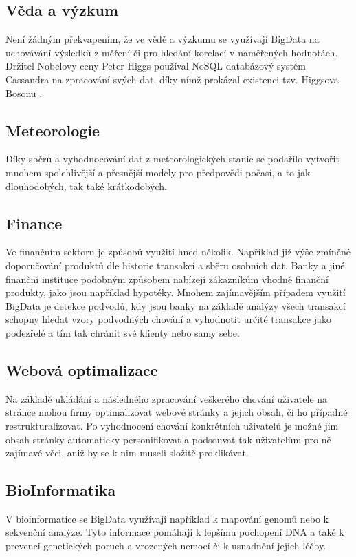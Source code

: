 \subsection{Věda a výzkum}

Není žádným překvapením, že ve vědě a výzkumu se využívají BigData na uchovávání výsledků z měření či pro hledání korelací v naměřených hodnotách. Držitel Nobelovy ceny Peter Higgs používal NoSQL databázový systém Cassandra na zpracování svých dat, díky nímž prokázal existenci tzv. Higgsova Bosonu \cite{higgs}.

\subsection{Meteorologie}
Díky sběru a vyhodnocování dat z meteorologických stanic se podařilo vytvořit mnohem spolehlivější a přesnější modely pro předpovědi počasí, a to jak dlouhodobých, tak také krátkodobých. 

\subsection{Finance}
Ve finančním sektoru je způsobů využití hned několik. Například již výše zmíněné doporučování produktů dle historie transakcí a sběru  osobních dat. Banky a jiné finanční instituce podobným způsobem nabízejí zákazníkům vhodné finanční produkty, jako jsou například hypotéky. Mnohem zajímavějším případem využití BigData je detekce podvodů, kdy jsou banky na základě analýzy všech transakcí schopny hledat vzory podvodných chování a vyhodnotit určité transakce jako podezřelé a tím tak chránit své klienty nebo samy sebe.

\subsection{Webová optimalizace}
Na základě ukládání a následného zpracování veškerého chování uživatele na stránce mohou firmy optimalizovat webové stránky a jejich obsah, či ho případně restrukturalizovat. Po vyhodnocení chování konkrétních uživatelů je možné jim obsah stránky automaticky personifikovat a podsouvat tak uživatelům pro ně zajímavé věci, aniž by se k nim museli složitě proklikávat.

\subsection{BioInformatika}
V bioinformatice se BigData využívají například k mapování genomů nebo k sekvenční analýze. Tyto informace pomáhají k lepšímu pochopení DNA a také k prevenci genetických poruch a vrozených nemocí či k usnadnění jejich léčby. \cite{industries} 

